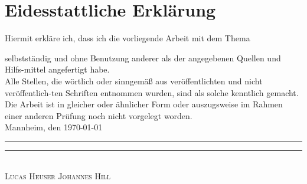 \chapter*{Eidesstattliche Erklärung}

Hiermit erkläre ich, dass ich die vorliegende Arbeit mit dem Thema
\begin{quote}
\textit{\titel}%
\end{quote}
selbstständig und ohne Benutzung anderer als der angegebenen Quellen und Hilfs-mittel angefertigt habe. \\[2ex]
Alle Stellen, die wörtlich oder sinngemäß aus veröffentlichten und nicht veröffentlich-ten Schriften entnommen wurden, sind als solche kenntlich gemacht. \\[2ex]
Die Arbeit ist in gleicher oder ähnlicher Form oder auszugsweise im Rahmen einer anderen Prüfung noch nicht vorgelegt worden.
\\[10ex]


Mannheim, den \today \\[4ex]


\rule[-0.2cm]{5cm}{0.5pt} \hspace{4cm} \rule[-0.2cm]{5cm}{0.5pt} \\

\textsc{Lucas Heuser} \hspace{6,6cm} \textsc{Johannes Hill}

